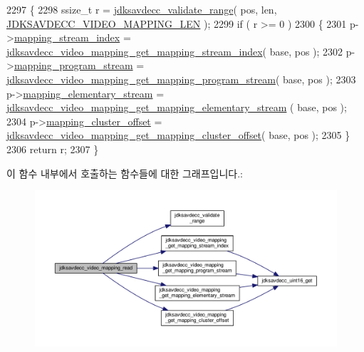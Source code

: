 \begin{DoxyCode}
2297 \{
2298     ssize\_t r = \hyperlink{group__util_ga9c02bdfe76c69163647c3196db7a73a1}{jdksavdecc\_validate\_range}( pos, len, 
      \hyperlink{group__video__mapping_gabf764135c5b516f8e5017b4060faef0f}{JDKSAVDECC\_VIDEO\_MAPPING\_LEN} );
2299     \textcolor{keywordflow}{if} ( r >= 0 )
2300     \{
2301         p->\hyperlink{structjdksavdecc__video__mapping_ae776f05f1f60f83a69c154844271ca4a}{mapping\_stream\_index} = 
      \hyperlink{group__video__mapping_ga7688f5d9329a936329a254fcb5a266ad}{jdksavdecc\_video\_mapping\_get\_mapping\_stream\_index}( base, 
      pos );
2302         p->\hyperlink{structjdksavdecc__video__mapping_a71a5421044e2dd9e8a1bc1667b0acf84}{mapping\_program\_stream} = 
      \hyperlink{group__video__mapping_ga3527ae3f80ffc164d45b756c8a1f0824}{jdksavdecc\_video\_mapping\_get\_mapping\_program\_stream}( 
      base, pos );
2303         p->\hyperlink{structjdksavdecc__video__mapping_a17b2b1b6c4e5fe6a591563df87fc2cd4}{mapping\_elementary\_stream} = 
      \hyperlink{group__video__mapping_ga1f99ad7682071756397dd4518a566d4b}{jdksavdecc\_video\_mapping\_get\_mapping\_elementary\_stream}
      ( base, pos );
2304         p->\hyperlink{structjdksavdecc__video__mapping_ab57e85d38dacb8e4e841cf9f1fbd7a36}{mapping\_cluster\_offset} = 
      \hyperlink{group__video__mapping_ga4b598d018e5df68bd8f2d989a45d780a}{jdksavdecc\_video\_mapping\_get\_mapping\_cluster\_offset}( 
      base, pos );
2305     \}
2306     \textcolor{keywordflow}{return} r;
2307 \}
\end{DoxyCode}


이 함수 내부에서 호출하는 함수들에 대한 그래프입니다.\+:
\nopagebreak
\begin{figure}[H]
\begin{center}
\leavevmode
\includegraphics[width=350pt]{group__video__mapping_ga48d7f78cd000ae76bcff6f84d9a21115_cgraph}
\end{center}
\end{figure}



